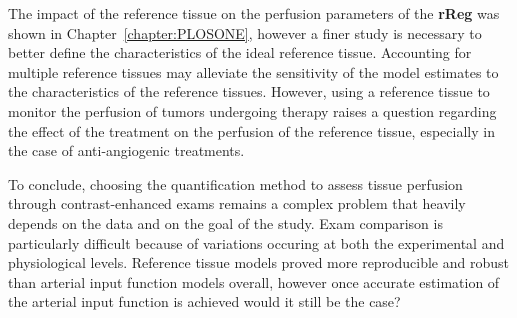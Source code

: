 The impact of the reference tissue on the perfusion parameters of the \textbf{rReg} was shown in Chapter~\ref{chapter:PLOSONE}, however a finer study is necessary to better define the characteristics of the ideal reference tissue. 
Accounting for multiple reference tissues may alleviate the sensitivity of the model estimates to the characteristics of the reference tissues.
However, using a reference tissue to monitor the perfusion of tumors undergoing therapy raises a question regarding the effect of the treatment on the perfusion of the reference tissue, especially in the case of anti-angiogenic treatments.

To conclude, choosing the quantification method to assess tissue perfusion through contrast-enhanced exams remains a complex problem that heavily depends on the data and on the goal of the study.
Exam comparison is particularly difficult because of variations occuring at both the experimental and physiological levels.
Reference tissue models proved more reproducible and robust than arterial input function models overall, however once accurate estimation of the arterial input function is achieved would it still be the case?


% 
% 